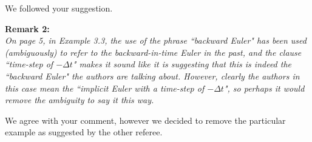 \documentclass[12pt]{article}
\newcommand{\remark}[2]{\vspace{25pt} \noindent \textbf{Remark #1:\newline} \textit{#2}\vspace{15pt}}
\renewcommand{\newline}{\vspace{15pt}\\}
\begin{document}
We followed your suggestion.

\remark{2}{
On page 5, in Example 3.3, the use of the phrase ``backward Euler" has been used 
(ambiguously) to refer to the backward-in-time Euler in the past, and the clause 
``time-step of $-\Delta t$" makes it sound like it is suggesting that this is indeed 
the ``backward Euler" the authors are talking about. 
However, clearly the authors in this case mean the ``implicit Euler with a time-step 
of $-\Delta t$", so perhaps it would remove the ambiguity to say it this way.}

We agree with your comment, however we decided to remove the particular example 
as suggested by the other referee.
\end{document}
